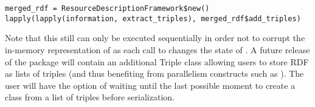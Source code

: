 \begin{lstlisting}[style=customr]
merged_rdf = ResourceDescriptionFramework$new()
lapply(lapply(information, extract_triples), merged_rdf$add_triples)
\end{lstlisting}

Note that this still can only be executed sequentially in order not to corrupt the in-memory representation of  as each call to  changes the state of . A future release of the package will contain an additional Triple class allowing users to store RDF as lists of triples (and thus benefiting from parallelism constructs such as ). The user will have the option of waiting until the last possible moment to create a  class from a list of triples before serialization.